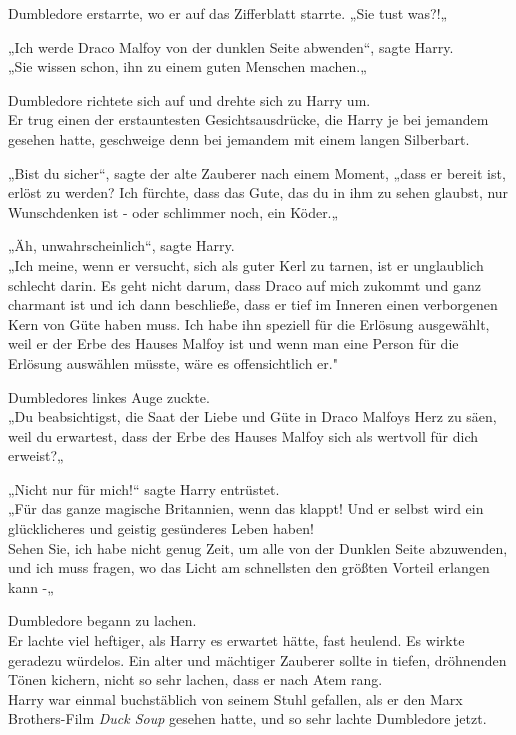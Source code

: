 {Dumbledore erstarrte, wo er auf das Zifferblatt starrte. „Sie tust was?!„

„Ich werde Draco Malfoy von der dunklen Seite abwenden“, sagte Harry.\\ „Sie wissen schon, ihn zu einem guten Menschen machen.„

Dumbledore richtete sich auf und drehte sich zu Harry um.\\ Er trug einen der erstauntesten Gesichtsausdrücke, die Harry je bei jemandem gesehen hatte, geschweige denn bei jemandem mit einem langen Silberbart.

„Bist du sicher“, sagte der alte Zauberer nach einem Moment, „dass er bereit ist, erlöst zu werden? Ich fürchte, dass das Gute, das du in ihm zu sehen glaubst, nur Wunschdenken ist - oder schlimmer noch, ein Köder.„

„Äh, unwahrscheinlich“, sagte Harry.\\ „Ich meine, wenn er versucht, sich als guter Kerl zu tarnen, ist er unglaublich schlecht darin. Es geht nicht darum, dass Draco auf mich zukommt und ganz charmant ist und ich dann beschließe, dass er tief im Inneren einen verborgenen Kern von Güte haben muss. Ich habe ihn speziell für die Erlösung ausgewählt, weil er der Erbe des Hauses Malfoy ist und wenn man eine Person für die Erlösung auswählen müsste, wäre es offensichtlich er."

Dumbledores linkes Auge zuckte.\\ „Du beabsichtigst, die Saat der Liebe und Güte in Draco Malfoys Herz zu säen, weil du erwartest, dass der Erbe des Hauses Malfoy sich als wertvoll für dich erweist?„

„Nicht nur für mich!“ sagte Harry entrüstet.\\ „Für das ganze magische Britannien, wenn das klappt! Und er selbst wird ein glücklicheres und geistig gesünderes Leben haben!\\ Sehen Sie, ich habe nicht genug Zeit, um alle von der Dunklen Seite abzuwenden, und ich muss fragen, wo das Licht am schnellsten den größten Vorteil erlangen kann -„

Dumbledore begann zu lachen.\\ Er lachte viel heftiger, als Harry es erwartet hätte, fast heulend. Es wirkte geradezu würdelos. Ein alter und mächtiger Zauberer sollte in tiefen, dröhnenden Tönen kichern, nicht so sehr lachen, dass er nach Atem rang.\\ Harry war einmal buchstäblich von seinem Stuhl gefallen, als er den Marx Brothers-Film \emph{Duck Soup} gesehen hatte, und so sehr lachte Dumbledore jetzt.

}
